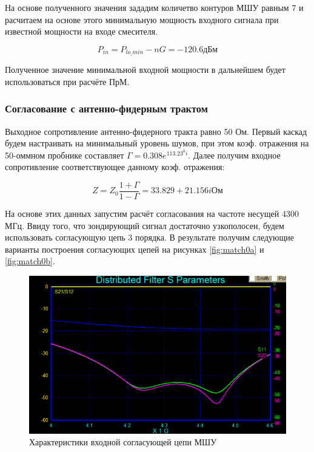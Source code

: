\documentclass[utf8x, 14pt, oneside, a4paper]{article}
\begin{document}
				На основе полученного значения зададим количетво контуров МШУ равным 7 и расчитаем на основе этого минимальную мощность входного сигнала при известной мощности на входе смесителя.
				
				\begin{equation}
					\label{eq:P_in}
					P_{in}=P_{lo\_min}-nG=-120.6 \text{дБм}
				\end{equation}
				
				Полученное значение минимальной входной мощности в дальнейшем будет использоваться при расчёте ПрМ.
				 
			\subsubsection{Согласование с антенно-фидерным трактом}
				Выходное сопротивление антенно-фидерного тракта равно 50 Ом. Первый каскад будем настраивать на минимальный уровень шумов, при этом коэф. отражения на 50-оммном пробнике составляет $\Gamma=0.308e^{113.23^{0}i}$. Далее получим входное сопротивление соответствующее данному коэф. отражения:
				
				\begin{equation}
					\label{eq:Gam_amp0}
					Z=Z_{0}\frac{1+\Gamma}{1-\Gamma}=33.829+21.156i \text{Ом}
				\end{equation}
				
				На основе этих данных запустим расчёт согласования на частоте несущей 4300 МГц. Ввиду того, что зондирующий сигнал достаточно узкополосен, будем использовать согласующую цепь 3 порядка. В результате получим следующие варианты построения согласующих цепей на рисунках \ref{fig:match0a} и \ref{fig:match0b}. 
				
				\begin{figure}[H]
					\centering
					\includegraphics[width=0.7\linewidth]{"Рисунки/Графики/Согласование с антенной"}
					\caption{{Характеристики входной согласующей цепи МШУ}}
					\label{fig:graf:match0}
				\end{figure}
				
\end{document}
